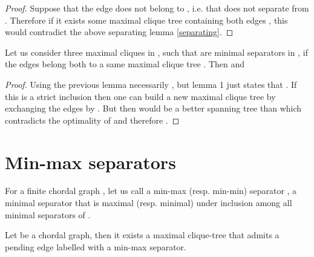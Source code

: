 \documentclass{endm}
\begin{document}
\begin{proof} 
Suppose that the edge  does not belong to , i.e. that  does not separate  from .  Therefore if it exists some maximal clique tree   containing both edges ,  this would contradict the above separating lemma \ref{separating}.
\end{proof}

\begin{lemma}
Let us consider three maximal cliques  in  ,  such that   are minimal separators in ,  if the edges    belong both to a same  maximal clique tree . Then   and  
\end{lemma}

\begin{proof} Using the previous lemma necessarily , but lemma 1 just states that 
.  If this is a strict inclusion then one can build a new maximal clique tree  by exchanging the edges 
 by . But then  would be a better spanning tree than  which contradicts  the optimality of  and therefore .
\end{proof}

\section{Min-max separators}

For a finite chordal graph  ,  let us call a  min-max (resp. min-min) separator  , a minimal separator that is maximal (resp. minimal) under inclusion among all minimal separators of . 

\begin{theorem}\cite{LMP08}
Let  be a chordal graph, then it exists a maximal clique-tree  that admits a pending edge labelled with a min-max  separator.
\end{theorem}
\end{document}
